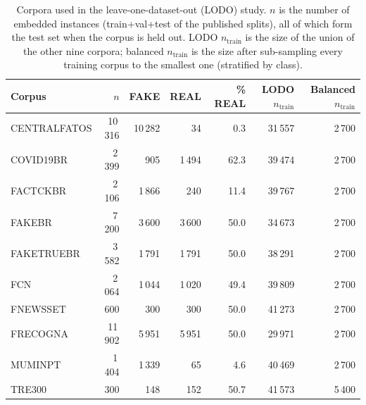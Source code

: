 \begin{table}[t]
\centering
\small
\caption{Corpora used in the leave-one-dataset-out (LODO) study. $n$ is the number of embedded instances (train+val+test of the published splits), all of which form the test set when the corpus is held out. LODO $n_{\text{train}}$ is the size of the union of the other nine corpora; balanced $n_{\text{train}}$ is the size after sub-sampling every training corpus to the smallest one (stratified by class).}
\label{tab:corpora-lodo}
\begin{tabular}{lrrrrrr}
\toprule
Corpus & $n$ & FAKE & REAL & \% REAL & LODO $n_{\text{train}}$ & Balanced $n_{\text{train}}$ \\
\midrule
CENTRALFATOS & 10\,316 & 10\,282 & 34 & 0.3 & 31\,557 & 2\,700 \\
COVID19BR & 2\,399 & 905 & 1\,494 & 62.3 & 39\,474 & 2\,700 \\
FACTCKBR & 2\,106 & 1\,866 & 240 & 11.4 & 39\,767 & 2\,700 \\
FAKEBR & 7\,200 & 3\,600 & 3\,600 & 50.0 & 34\,673 & 2\,700 \\
FAKETRUEBR & 3\,582 & 1\,791 & 1\,791 & 50.0 & 38\,291 & 2\,700 \\
FCN & 2\,064 & 1\,044 & 1\,020 & 49.4 & 39\,809 & 2\,700 \\
FNEWSSET & 600 & 300 & 300 & 50.0 & 41\,273 & 2\,700 \\
FRECOGNA & 11\,902 & 5\,951 & 5\,951 & 50.0 & 29\,971 & 2\,700 \\
MUMINPT & 1\,404 & 1\,339 & 65 & 4.6 & 40\,469 & 2\,700 \\
TRE300 & 300 & 148 & 152 & 50.7 & 41\,573 & 5\,400 \\
\bottomrule
\end{tabular}
\end{table}
